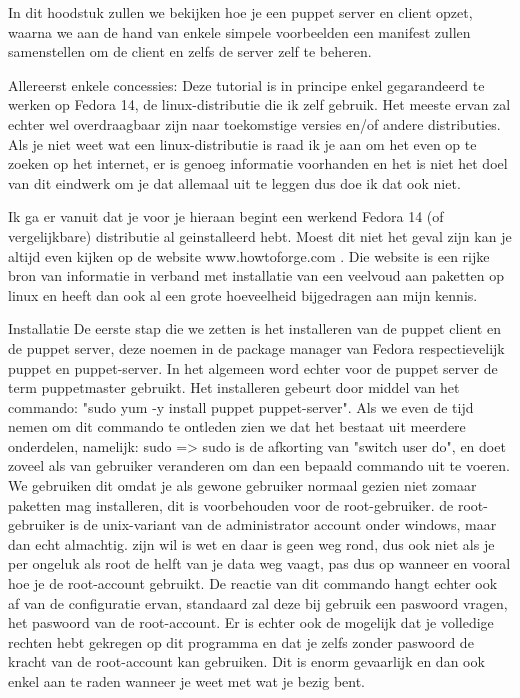 
In dit hoodstuk zullen we bekijken hoe je een puppet server en client opzet, waarna we aan de hand van enkele simpele voorbeelden een manifest zullen samenstellen om de client en zelfs de server zelf te beheren.

Allereerst enkele concessies: Deze tutorial is in principe enkel gegarandeerd te werken op Fedora 14, de linux-distributie die ik zelf gebruik. Het meeste ervan zal echter wel overdraagbaar zijn naar toekomstige versies en/of andere distributies. Als je niet weet wat een linux-distributie is raad ik je aan om het even op te zoeken op het internet, er is genoeg informatie voorhanden en het is niet het doel van dit eindwerk om je dat allemaal uit te leggen dus doe ik dat ook niet.

Ik ga er vanuit dat je voor je hieraan begint een werkend Fedora 14 (of vergelijkbare) distributie al geinstalleerd hebt. Moest dit niet het geval zijn kan je altijd even kijken op de website www.howtoforge.com . Die website is een rijke bron van informatie in verband met installatie van een veelvoud aan paketten op linux en heeft dan ook al een grote hoeveelheid bijgedragen aan mijn kennis.


Installatie
De eerste stap die we zetten is het installeren van de puppet client en de puppet server, deze noemen in de package manager van Fedora respectievelijk puppet en puppet-server. In het algemeen word echter voor de puppet server de term puppetmaster gebruikt. Het installeren gebeurt door middel van het commando: "sudo yum -y install puppet puppet-server". Als we even de tijd nemen om dit commando te ontleden zien we dat het bestaat uit meerdere onderdelen, namelijk: sudo => sudo is de afkorting van "switch user do", en doet zoveel als van gebruiker veranderen om dan een bepaald commando uit te voeren. We gebruiken dit omdat je als gewone gebruiker normaal gezien niet zomaar paketten mag installeren, dit is voorbehouden voor de root-gebruiker. de root-gebruiker is de unix-variant van de administrator account onder windows, maar dan echt almachtig. zijn wil is wet en daar is geen weg rond, dus ook niet als je per ongeluk als root de helft van je data weg vaagt, pas dus op wanneer en vooral hoe je de root-account gebruikt. De reactie van dit commando hangt echter ook af van de configuratie ervan, standaard zal deze bij gebruik een paswoord vragen, het paswoord van de root-account. Er is echter ook de mogelijk dat je volledige rechten hebt gekregen op dit programma en dat je zelfs zonder paswoord de kracht van de root-account kan gebruiken. Dit is enorm gevaarlijk en dan ook enkel aan te raden wanneer je weet met wat je bezig bent.

